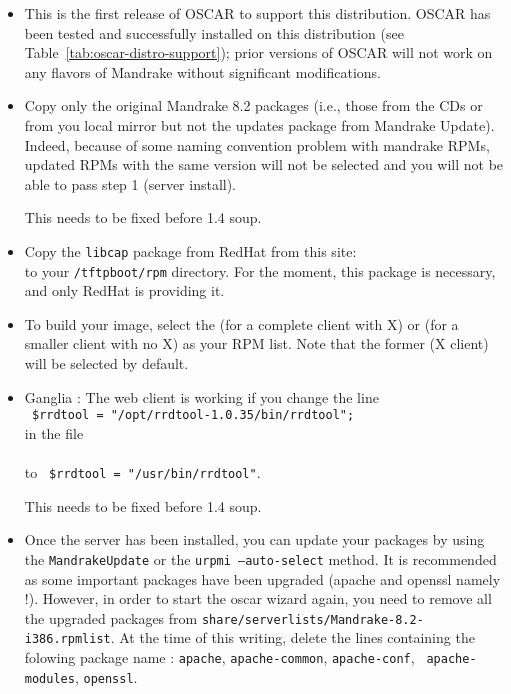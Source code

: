 \begin{itemize}
\item This is the first release of OSCAR to support this distribution.
  OSCAR \oscarversion\- has been tested and successfully installed on
  this distribution (see Table~\ref{tab:oscar-distro-support}); prior
  versions of OSCAR will not work on any flavors of Mandrake without
  significant modifications.
  
\item Copy only the original Mandrake 8.2 packages (i.e., those from
  the CDs or from you local mirror but not the updates package from
  Mandrake Update).  Indeed, because of some naming convention problem
  with mandrake RPMs, updated RPMs with the same version will not be
  selected and you will not be able to pass step 1 (server install).
  
  \begin{discuss}
    This needs to be fixed before 1.4 soup.
  \end{discuss}
  
\item Copy the {\tt libcap} package from RedHat from this site: \\
  to your {\tt /tftpboot/rpm} directory. For the moment, this package
  is necessary, and only RedHat is providing it.
  
\item To build your image, select the
   (for a complete client
  with X) or  (for a
  smaller client with no X) as your RPM list.  Note that the former (X
  client) will be selected by default.

\item Ganglia : The web client is working if you change the line \\
  \verb+ $rrdtool = "/opt/rrdtool-1.0.35/bin/rrdtool";+ \\
  in the file \\
  \\ 
  to \verb+ $rrdtool = "/usr/bin/rrdtool"+.
  
  \begin{discuss}
    This needs to be fixed before 1.4 soup.
  \end{discuss}

\item Once the server has been installed, you can update your packages
  by using the {\tt MandrakeUpdate} or the {\tt urpmi --auto-select}
  method. It is recommended as some important packages have been
  upgraded (apache and openssl namely !).  However, in order to start
  the oscar wizard again, you need to remove all the upgraded packages
  from {\tt share/serverlists/Mandrake-8.2-i386.rpmlist}.  At the time
  of this writing, delete the lines containing the folowing package
  name : {\tt apache}, {\tt apache-common}, {\tt apache-conf}, {\tt
    apache-modules}, {\tt openssl}.
  

\end{itemize}
